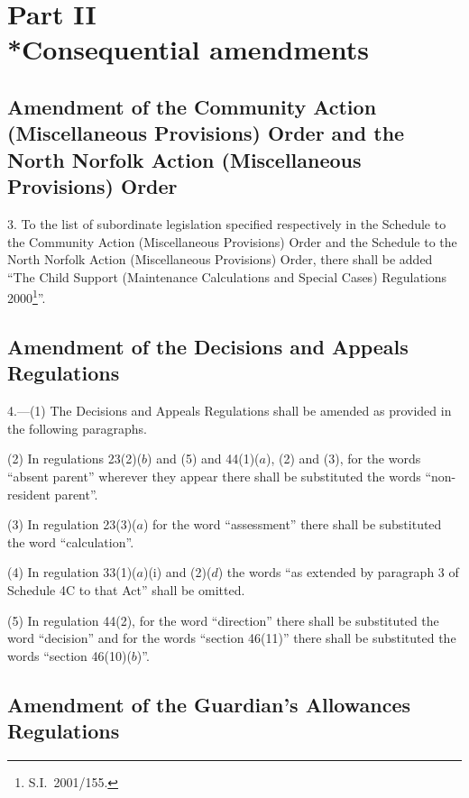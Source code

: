 \documentclass[12pt,a4paper]{article}
\begin{document}
\section[Part II --- Consequential amendments]{Part II\\*Consequential amendments}

\renewcommand\parthead{--- Part II}

\subsection[3. Amendment of the Community Action (Miscellaneous Provisions) Order and the North Norfolk Action (Miscellaneous Provisions) Order]{\sloppy Amendment of the Community Action (Miscellaneous Provisions) Order and the North Norfolk Action (Miscellaneous Provisions) Order}

3.  To the list of subordinate legislation specified respectively in the Schedule to the Community Action (Miscellaneous Provisions) Order and the Schedule to the North Norfolk Action (Miscellaneous Provisions) Order, there shall be added “The Child Support (Maintenance Calculations and Special Cases) Regulations 2000\footnote{S.I.\ 2001/155.}”.

\subsection[4. Amendment of the Decisions and Appeals Regulations]{Amendment of the Decisions and Appeals Regulations}

4.---(1)  The Decisions and Appeals Regulations shall be amended as provided in the following paragraphs.

(2) In regulations 23(2)($b$)  and (5) and 44(1)($a$), (2) and (3), for the words “absent parent” wherever they appear there shall be substituted the words “non-resident parent”.

(3) In regulation 23(3)($a$)  for the word “assessment” there shall be substituted the word “calculation”.

(4) In regulation 33(1)($a$)(i) and (2)($d$)  the words “as extended by paragraph 3 of Schedule 4C to that Act” shall be omitted.

(5) In regulation 44(2), for the word “direction” there shall be substituted the word “decision” and for the words “section 46(11)” there shall be substituted the words “section 46(10)($b$)”.

\subsection[5. Amendment of the Guardian’s Allowances Regulations]{Amendment of the Guardian’s Allowances Regulations}
\end{document}
